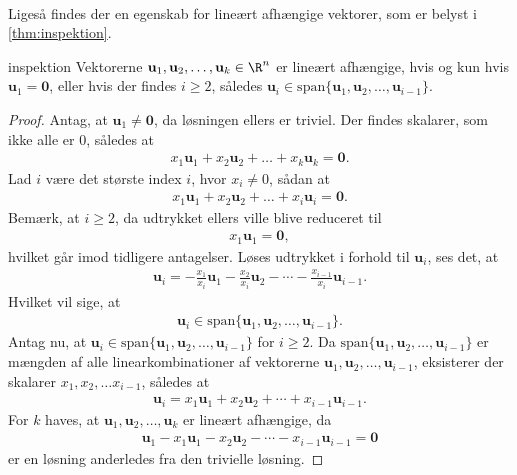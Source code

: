 \\
%
%
Ligeså findes der en egenskab for lineært afhængige vektorer, som er belyst i \ref{thm:inspektion}.
%
%
\begin{thm}{}{inspektion}
%
Vektorerne $\mathbf{u}_1,\mathbf{u}_2, \ldots ,\mathbf{u}_k \in\R^n$ er lineært afhængige, 
hvis og kun hvis $\mathbf{u}_1=\mathbf{0}$, eller hvis der findes $i \geq 2$, således $\mathbf{u}_i \in \text{span} \{ \mathbf{u}_1,\mathbf{u}_2, \ldots ,\mathbf{u}_{i-1} \}$.
%
\end{thm}
%
%
\begin{proof}
% 
Antag, at $\mathbf{u}_1 \neq \mathbf{0}$, da løsningen ellers er triviel. 
Der findes skalarer, som ikke alle er $0$, således at
% 
\begin{align*}
x_1 \mathbf{u}_1 + x_2 \mathbf{u}_2 + \ldots + x_k \mathbf{u}_k = \mathbf{0}.
\end{align*}
%
Lad $i$ være det største index $i$, hvor $x_i \neq 0$, sådan at 
\begin{align*}
x_1 \mathbf{u}_1 + x_2 \mathbf{u}_2 + \ldots + x_i \mathbf{u}_i = \mathbf{0}.
\end{align*}
Bemærk, at $i\geq 2$, da udtrykket ellers ville blive reduceret til
%
\begin{align*}
x_1\textbf{u}_1=\mathbf{0},
\end{align*}
%
hvilket går imod tidligere antagelser.
Løses udtrykket i forhold til $\mathbf{u}_i$, ses det, at
\begin{align*}
\mathbf{u}_i = - \frac{x_1}{x_i} \mathbf{u}_1 - \frac{x_2}{x_i} \mathbf{u}_2 - \cdots - \frac{x_{i-1}}{x_i} \mathbf{u}_{i-1}.
\end{align*}
Hvilket vil sige, at 
\begin{align*}
\mathbf{u}_i \in \text{span}\{ \mathbf{u}_1,\mathbf{u}_2, \ldots ,\mathbf{u}_{i-1} \}.
\end{align*}
%
Antag nu, at $\mathbf{u}_i \in \text{span}\{ \mathbf{u}_1,\mathbf{u}_2, \ldots ,\mathbf{u}_{i-1} \}$ for $i \geq 2$.
Da $\text{span}\{ \mathbf{u}_1,\mathbf{u}_2, \ldots ,\mathbf{u}_{i-1} \}$ er mængden af alle linearkombinationer af vektorerne $\mathbf{u}_1,\mathbf{u}_2, \ldots ,\mathbf{u}_{i-1}$, eksisterer der skalarer $x_1, x_2, \ldots x_{i-1}$, således at
%
\begin{align*}
\textbf{u}_i=x_1\mathbf{u}_1 + x_2 \mathbf{u}_2 + \cdots + x_{i-1}\mathbf{u}_{i-1}.
\end{align*}
%
For $k $ haves, at $\mathbf{u}_1,\mathbf{u}_2, \ldots ,\mathbf{u}_k$ er lineært afhængige, da 
\begin{align*}
\textbf{u}_1 -x_1\textbf{u}_1 - x_2\textbf{u}_2 - \cdots - x_{i-1}\textbf{u}_{i-1} = \textbf{0}
\end{align*} 
er en løsning anderledes fra den trivielle løsning.
%
\end{proof}
